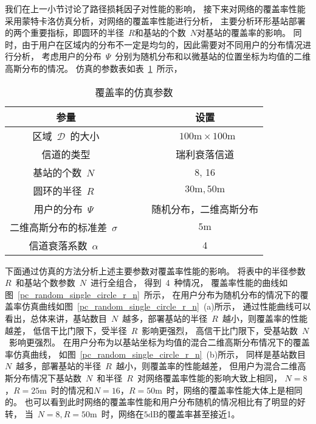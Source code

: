 我们在上一小节讨论了路径损耗因子对性能的影响，
接下来对网络的覆盖率性能采用蒙特卡洛仿真分析，对网络的覆盖率性能进行分析，
主要分析环形基站部署的两个重要指标，即圆环的半径~$R$和基站的个数~$N$对基站的覆盖率的影响。
同时，由于用户在区域内的分布不一定是均匀的，因此需要对不同用户的分布情况进行分析，
考虑用户的分布~$\Psi$~分别为随机分布和以微基站的位置坐标为均值的二维高斯分布的情况。
仿真的参数表如表~\ref{single_circle_pc_sim_para}~所示，
\begin{table}[htbp]
\caption{覆盖率的仿真参数}
\label{single_circle_pc_sim_para}
\vspace{0.5em}\centering\wuhao
\begin{tabular}{cccc}
\toprule[1.5pt]
参量 & & & 设置 \\
\midrule[0.5pt]
区域~$\mathcal{D}$~的大小  & & & ~$100\mathrm{m} \times 100 \mathrm{m}$ \\
信道的类型 & & &  瑞利衰落信道\\
基站的个数~$N$~ & & &  8, 16\\
圆环的半径~$R$~ & & &  ${30\mathrm{m}},{50\mathrm{m}}$\\
用户的分布~$\Psi$~ & & & 随机分布，二维高斯分布\\
二维高斯分布的标准差~$\sigma$~ & & & ${5\mathrm{m}}$\\
信道衰落系数~$\alpha$~  & & & 4\\
\bottomrule[1.5pt]
\end{tabular}
\end{table}
下面通过仿真的方法分析上述主要参数对覆盖率性能的影响。
将表中的半径参数~$R$~和基站个数参数~$N$~进行全组合，
得到~4~种情况，
覆盖率性能的曲线如图~\ref{pc_random_single_circle_r_n}~所示，
在用户分布为随机分布的情况下的覆盖率仿真曲线如图~\ref{pc_random_single_circle_r_n}~(a)所示，
通过性能曲线可以看出，总体来讲，基站数目~$N$~越多，部署基站的半径~$R$~越小，则覆盖率的性能越差，
低信干比门限下，受半径~$R$~影响更强烈，
高信干比门限下，受基站数~$N$~影响更强烈。
在用户分布为以基站坐标为均值的混合二维高斯分布情况下的覆盖率仿真曲线，
如图~\ref{pc_random_single_circle_r_n}~(b)所示，
同样是基站数目~$N$~越多，部署基站的半径~$R$~越小，则覆盖率的性能越差，
但用户为混合二维高斯分布情况下基站数~$N$~和半径~$R$~对网络覆盖率性能的影响大致上相同，
$N=8$，$R=25\mathrm{m}$~时的情况和$N=16$，$R=50\mathrm{m}$~时，网络的覆盖率性能大体上是相同的。
也可以看到此时网络的覆盖率性能和用户分布随机的情况相比有了明显的好转，
当~$N=8,R=50\mathrm{m}$~时，网络在$5\mathrm{dB}$的覆盖率甚至接近1。

